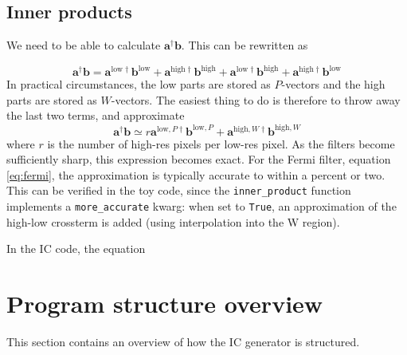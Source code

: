 \documentclass[11pt,a4paper,preprint]{aastex}
\newcommand{\low}{\mathrm{low}}
\newcommand{\high}{\mathrm{high}}
\newcommand{\bmath}[1]{\ensuremath{\bm{#1}}}
\renewcommand{\vec}[1]{\bmath{#1}}
\begin{document}
\subsection{Inner products}

We need to be able to calculate $\vec{a}^{\dagger} \vec{b}$. This can
be rewritten as 

\begin{equation}
    \vec{a}^{\dagger} \vec{b} = \vec{a}^{\low\dagger}
    \vec{b}^{\low} + \vec{a}^{\high\dagger} \vec{b}^{\high} +
    \vec{a}^{\low\dagger}\vec{b}^{\high} + \vec{a}^{\high\dagger} \vec{b}^{\low}
\end{equation}
In practical circumstances, the low parts are stored as $P$-vectors
and the high parts are stored as $W$-vectors. The easiest thing to do
is therefore to throw away the last two terms, and approximate
\begin{equation}
  \vec{a}^{\dagger} \vec{b} \simeq r \vec{a}^{\low,P\dagger}
    \vec{b}^{\low,P} + \vec{a}^{\high,W\dagger} \vec{b}^{\high,W}
\end{equation}
where $r$ is the number of high-res pixels per low-res pixel.
As the filters become sufficiently sharp, this expression becomes
exact. For the Fermi filter, equation \eqref{eq:fermi}, the
approximation is typically accurate to within a percent or two. This
can be verified in the toy code, since the {\tt inner\_product} function
implements a {\tt more\_accurate} kwarg: when set to {\tt True}, an
approximation of the high-low crossterm is added (using interpolation
into the W region). 

In the IC code, the equation 


\section{Program structure overview}

This section contains an overview of how the IC generator is structured.
\end{document}
